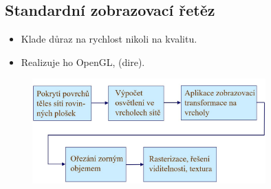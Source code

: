 \subsection{Standardní zobrazovací řetěz}
\begin{itemize}
	\item Klade důraz na rychlost nikoli na kvalitu.
	\item Realizuje ho OpenGL, (dire).
\end{itemize}
\begin{figure}[H]
\centering
\includegraphics[width=0.8\textwidth]{assets/5_retezec}
\end{figure}


